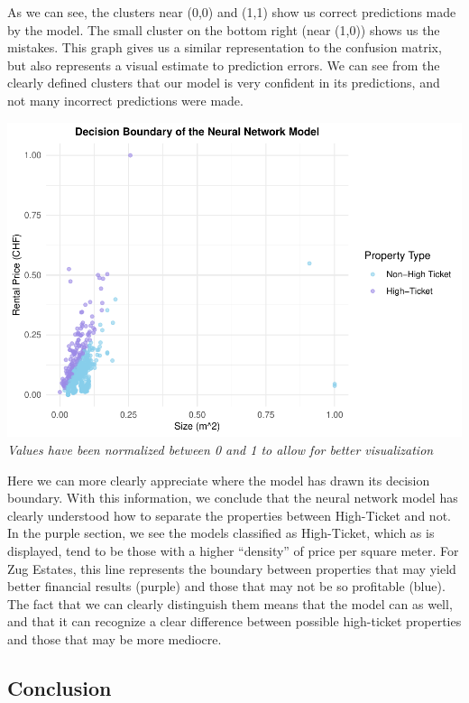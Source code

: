 \documentclass[
]{article}
\begin{document}
As we can see, the clusters near (0,0) and (1,1) show us correct
predictions made by the model. The small cluster on the bottom right
(near (1,0)) shows us the mistakes. This graph gives us a similar
representation to the confusion matrix, but also represents a visual
estimate to prediction errors. We can see from the clearly defined
clusters that our model is very confident in its predictions, and not
many incorrect predictions were made.

\includegraphics{2024_groupXX_report_files/figure-latex/NN Decision Boundary-1.pdf}
\emph{Values have been normalized between 0 and 1 to allow for better
visualization}

Here we can more clearly appreciate where the model has drawn its
decision boundary. With this information, we conclude that the neural
network model has clearly understood how to separate the properties
between High-Ticket and not. In the purple section, we see the models
classified as High-Ticket, which as is displayed, tend to be those with
a higher ``density'' of price per square meter. For Zug Estates, this
line represents the boundary between properties that may yield better
financial results (purple) and those that may not be so profitable
(blue). The fact that we can clearly distinguish them means that the
model can as well, and that it can recognize a clear difference between
possible high-ticket properties and those that may be more mediocre.

\subsection{Conclusion}\label{conclusion-3}
\end{document}

